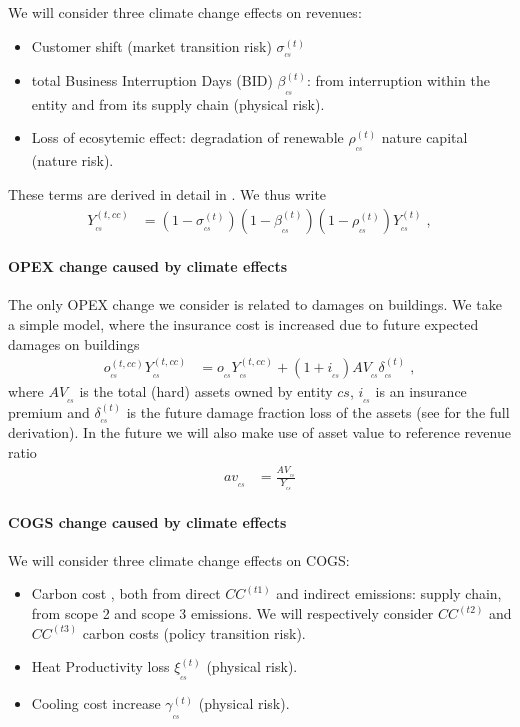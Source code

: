 We will consider three climate change effects on revenues:
\begin{itemize}
\item[•] Customer shift (market transition risk) $\sigma^{(t)}_{_{cs}}$
\item[•] total Business Interruption Days (BID) $\beta^{(t)}_{_{cs}}$: from interruption within the entity and from its supply chain (physical risk).
\item[•] Loss of ecosytemic effect: degradation of renewable $\rho^{(t)}_{_{cs}}$ nature capital (nature risk). 
\end{itemize}
These terms are derived in detail in \citet{epelbaum2025}. We thus write
\begin{align}
Y^{(t,cc)}_{_{cs}}&=\left(1-\sigma^{(t)}_{_{cs}}\right)\left(1-\beta^{(t)}_{_{cs}}\right)
%
\left(1-\rho^{(t)}_{_{cs}}\right)Y^{(t)}_{_{cs}}\;,\label{eq:revenue-cc}
\end{align}

\paragraph{OPEX change caused by climate effects}

The only OPEX change we consider is related to damages on buildings. We take a simple model, where the insurance cost\cite{Cummins} is increased due to future expected damages on buildings
\begin{align}
o^{(t,cc)}_{_{cs}}Y^{(t,cc)}_{_{cs}}&=o_{_{cs}}Y^{(t,cc)}_{_{cs}}+\left(1+i_{_{cs}}\right) AV_{_{cs}} \delta^{(t)}_{_{cs}}\;,
\end{align}
where $AV_{_{cs}}$ is the total (hard) assets owned by entity $cs$, $i_{_{cs}}$ is an insurance premium and $\delta^{(t)}_{_{cs}}$ is the future damage fraction loss of the assets (see \citet{epelbaum2025} for the full derivation). In the future we will also make use of asset value to reference revenue ratio
\begin{align}
 av_{_{cs}}&=\frac{ AV_{_{cs}}}{ Y_{_{cs}}}
\end{align}

\paragraph{COGS change caused by climate effects}

We will consider three climate change effects on COGS: 
\begin{itemize}
\item[•] Carbon cost , both from direct $CC^{(t1)}$ and indirect emissions: supply chain, from scope 2 and scope 3 emissions. We will respectively consider $CC^{(t2)}$ and $CC^{(t3)}$ carbon costs (policy transition risk).
\item[•] Heat Productivity loss $\xi^{(t)}_{_{cs}}$ (physical risk).
\item[•] Cooling cost increase $\gamma^{(t)}_{_{cs}}$ (physical risk).
\end{itemize}

